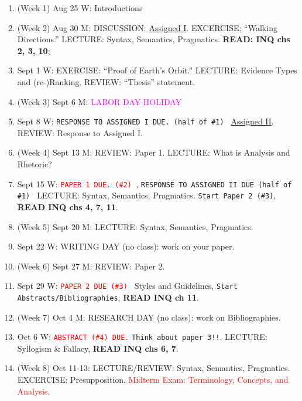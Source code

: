 \documentclass[11pt]{article}
\begin{document}
   \begin{enumerate}

\item (Week 1) Aug 25 W:  Introductions

\item (Week 2) Aug 30 M: DISCUSSION: \href{http://www.uvu.edu/library/guides/index.html}{Assigned I}. EXCERCISE: ``Walking Directions.'' LECTURE: Syntax, Semantics, Pragmatics. \textbf{READ: INQ chs 2, 3, 10}; 
\item[] Sept 1 W:  EXERCISE: ``Proof of Earth's Orbit.'' LECTURE: Evidence Types and (re-)Ranking. REVIEW: ``Thesis'' statement.  

\item (Week 3) Sept 6 M:  \textcolor{magenta}{LABOR DAY HOLIDAY}
\item[] Sept 8 W: \texttt{RESPONSE TO ASSIGNED I DUE. (half of \#1) } \href{http://www.uvu.edu/library/guides/index.html}{Assigned II}. REVIEW: Response to Assigned I.   

\item (Week 4) Sept 13 M: REVIEW: Paper 1. LECTURE: What is Analysis and Rhetoric?
\item[] Sept 15 W: \textcolor{red}{\texttt{PAPER 1 DUE. (\#2) }}, \texttt{RESPONSE TO ASSIGNED II DUE (half of \#1) } LECTURE: Syntax, Semantics, Pragmatics. \texttt{Start Paper 2 (\#3)}, \textbf{READ INQ chs 4, 7, 11}. 

\item (Week 5) Sept 20 M: LECTURE: Syntax, Semantics, Pragmatics. 
\item[] Sept 22 W: WRITING DAY (no class): work on your paper.  

\item (Week 6) Sept 27 M: REVIEW: Paper 2.
\item[] Sept 29 W: \textcolor{red}{\texttt{PAPER 2 DUE (\#3) }} Styles and Guidelines, \texttt{Start Abstracts/Bibliographies}, \textbf{READ INQ ch 11}.

\item (Week 7) Oct 4 M: RESEARCH DAY (no class): work on Bibliographies.
\item[] Oct 6 W: \textcolor{red}{\texttt{ABSTRACT (\#4) DUE.}} \texttt{Think about paper 3!!}. LECTURE: Syllogism \& Fallacy, \textbf{READ INQ chs 6, 7}.

\item (Week 8) Oct 11-13: LECTURE/REVIEW: Syntax, Semantics, Pragmatics. EXCERCISE: Presupposition. \textcolor{red}{Midterm Exam: Terminology, Concepts, and Analysis}.


\end{enumerate}
\end{document}

